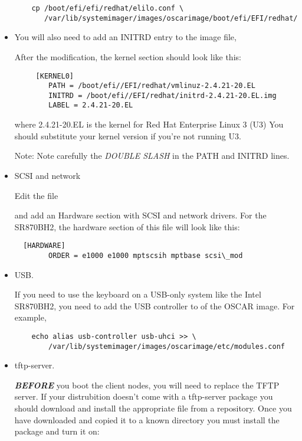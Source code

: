 \begin{itemize}
\begin{verbatim}
    cp /boot/efi/efi/redhat/elilo.conf \
       /var/lib/systemimager/images/oscarimage/boot/efi/EFI/redhat/
\end{verbatim}

\item {}

You will also need to add an INITRD entry to the image file,

After the modification, the kernel section should look like this:

\begin{verbatim}
     [KERNEL0]
        PATH = /boot/efi//EFI/redhat/vmlinuz-2.4.21-20.EL 
        INITRD = /boot/efi//EFI/redhat/initrd-2.4.21-20.EL.img 
        LABEL = 2.4.21-20.EL
\end{verbatim}

where 2.4.21-20.EL is the kernel for Red Hat Enterprise Linux 3 (U3)
You should substitute your kernel version if you're not running U3.

Note: Note carefully the \emph{DOUBLE SLASH} in the PATH and INITRD lines.


\item SCSI and network

Edit the file


and add an Hardware section with SCSI and network drivers.  For the
SR870BH2, the hardware section of this file will look like this: \\
\begin{verbatim}
  [HARDWARE] 
        ORDER = e1000 e1000 mptscsih mptbase scsi\_mod
\end{verbatim}

\item USB.

If you need to use the keyboard on a USB-only system like the Intel
SR870BH2, you need to add the USB controller to  of
the OSCAR image.  For example,

\begin{verbatim}
    echo alias usb-controller usb-uhci >> \
        /var/lib/systemimager/images/oscarimage/etc/modules.conf
\end{verbatim}


\item tftp-server.

{\bf \emph{BEFORE}} you boot the client nodes, you will need to replace 
the TFTP server.  If your distrubition doesn't come with a tftp-server 
package you should download and install the appropriate file from a
repository.  Once you have downloaded and copied it to a known
directory you must install the package and turn it on:


\end{itemize}
